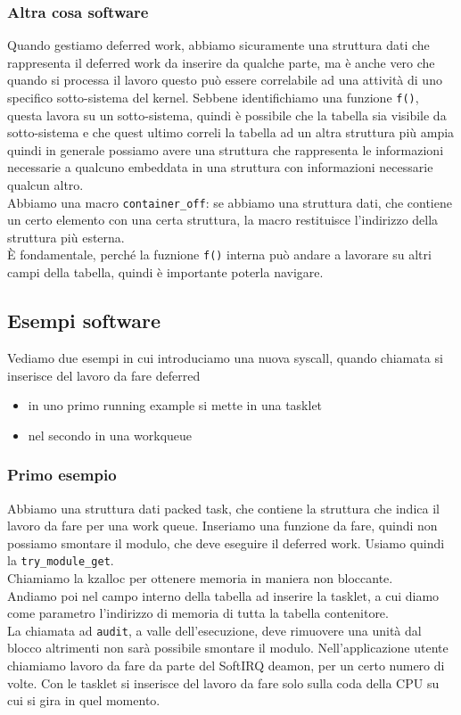 \documentclass[12pt, oneside]{extbook}
\begin{document}
\subsubsection{Altra cosa software}
Quando gestiamo deferred work, abbiamo sicuramente una struttura dati che rappresenta il deferred work da inserire da qualche parte, ma è anche vero che quando si processa il lavoro questo può essere correlabile ad una attività di uno specifico sotto-sistema del kernel. Sebbene identifichiamo una funzione \texttt{f()}, questa lavora su un sotto-sistema, quindi è possibile che la tabella sia visibile da sotto-sistema e che quest ultimo correli la tabella ad un altra struttura più ampia quindi in generale possiamo avere una struttura che rappresenta le informazioni necessarie a qualcuno embeddata in una struttura con informazioni necessarie qualcun altro.\\Abbiamo una macro \texttt{container\_off}: se abbiamo una struttura dati, che contiene un certo elemento con una certa struttura, la macro restituisce l'indirizzo della struttura più esterna.\\È fondamentale, perché la fuznione \texttt{f()} interna può andare a lavorare su altri campi della tabella, quindi è importante poterla navigare.
\subsection*{Esempi software}
Vediamo due esempi in cui introduciamo una nuova syscall, quando chiamata si inserisce del lavoro da fare deferred
\begin{itemize}
\item in uno primo running example si mette in una tasklet
\item nel secondo in una workqueue
\end{itemize}
\subsubsection{Primo esempio}
Abbiamo una struttura dati packed task, che contiene la struttura che indica il lavoro da fare per una work queue. Inseriamo una funzione da fare, quindi non possiamo smontare il modulo, che deve eseguire il deferred work. Usiamo quindi la \texttt{try\_module\_get}.\\Chiamiamo la kzalloc per ottenere memoria in maniera non bloccante.\\Andiamo poi nel campo interno della tabella ad inserire la tasklet, a cui diamo come parametro l'indirizzo di memoria di tutta la tabella contenitore.\\La chiamata ad \texttt{audit}, a valle dell'esecuzione, deve rimuovere una unità dal blocco altrimenti non sarà possibile smontare il modulo. Nell'applicazione utente chiamiamo lavoro da fare da parte del SoftIRQ deamon, per un certo numero di volte. Con le tasklet si inserisce del lavoro da fare solo sulla coda della CPU su cui si gira in quel momento.
\end{document}
